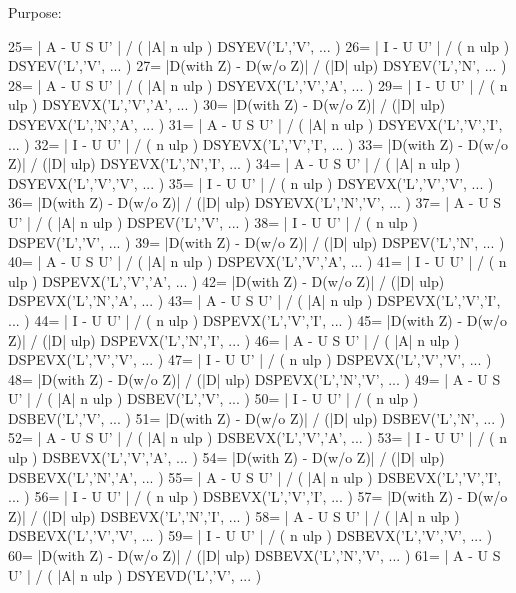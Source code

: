 \begin{DoxyParagraph}{Purpose\+: }
\begin{DoxyVerb}
    25= | A - U S U' | / ( |A| n ulp )        DSYEV('L','V', ... )
    26= | I - U U' | / ( n ulp )              DSYEV('L','V', ... )
    27= |D(with Z) - D(w/o Z)| / (|D| ulp)    DSYEV('L','N', ... )
    28= | A - U S U' | / ( |A| n ulp )        DSYEVX('L','V','A', ... )
    29= | I - U U' | / ( n ulp )              DSYEVX('L','V','A', ... )
    30= |D(with Z) - D(w/o Z)| / (|D| ulp)    DSYEVX('L','N','A', ... )
    31= | A - U S U' | / ( |A| n ulp )        DSYEVX('L','V','I', ... )
    32= | I - U U' | / ( n ulp )              DSYEVX('L','V','I', ... )
    33= |D(with Z) - D(w/o Z)| / (|D| ulp)    DSYEVX('L','N','I', ... )
    34= | A - U S U' | / ( |A| n ulp )        DSYEVX('L','V','V', ... )
    35= | I - U U' | / ( n ulp )              DSYEVX('L','V','V', ... )
    36= |D(with Z) - D(w/o Z)| / (|D| ulp)    DSYEVX('L','N','V', ... )
    37= | A - U S U' | / ( |A| n ulp )        DSPEV('L','V', ... )
    38= | I - U U' | / ( n ulp )              DSPEV('L','V', ... )
    39= |D(with Z) - D(w/o Z)| / (|D| ulp)    DSPEV('L','N', ... )
    40= | A - U S U' | / ( |A| n ulp )        DSPEVX('L','V','A', ... )
    41= | I - U U' | / ( n ulp )              DSPEVX('L','V','A', ... )
    42= |D(with Z) - D(w/o Z)| / (|D| ulp)    DSPEVX('L','N','A', ... )
    43= | A - U S U' | / ( |A| n ulp )        DSPEVX('L','V','I', ... )
    44= | I - U U' | / ( n ulp )              DSPEVX('L','V','I', ... )
    45= |D(with Z) - D(w/o Z)| / (|D| ulp)    DSPEVX('L','N','I', ... )
    46= | A - U S U' | / ( |A| n ulp )        DSPEVX('L','V','V', ... )
    47= | I - U U' | / ( n ulp )              DSPEVX('L','V','V', ... )
    48= |D(with Z) - D(w/o Z)| / (|D| ulp)    DSPEVX('L','N','V', ... )
    49= | A - U S U' | / ( |A| n ulp )        DSBEV('L','V', ... )
    50= | I - U U' | / ( n ulp )              DSBEV('L','V', ... )
    51= |D(with Z) - D(w/o Z)| / (|D| ulp)    DSBEV('L','N', ... )
    52= | A - U S U' | / ( |A| n ulp )        DSBEVX('L','V','A', ... )
    53= | I - U U' | / ( n ulp )              DSBEVX('L','V','A', ... )
    54= |D(with Z) - D(w/o Z)| / (|D| ulp)    DSBEVX('L','N','A', ... )
    55= | A - U S U' | / ( |A| n ulp )        DSBEVX('L','V','I', ... )
    56= | I - U U' | / ( n ulp )              DSBEVX('L','V','I', ... )
    57= |D(with Z) - D(w/o Z)| / (|D| ulp)    DSBEVX('L','N','I', ... )
    58= | A - U S U' | / ( |A| n ulp )        DSBEVX('L','V','V', ... )
    59= | I - U U' | / ( n ulp )              DSBEVX('L','V','V', ... )
    60= |D(with Z) - D(w/o Z)| / (|D| ulp)    DSBEVX('L','N','V', ... )
    61= | A - U S U' | / ( |A| n ulp )        DSYEVD('L','V', ... )

\end{DoxyVerb}
\end{DoxyParagraph}
